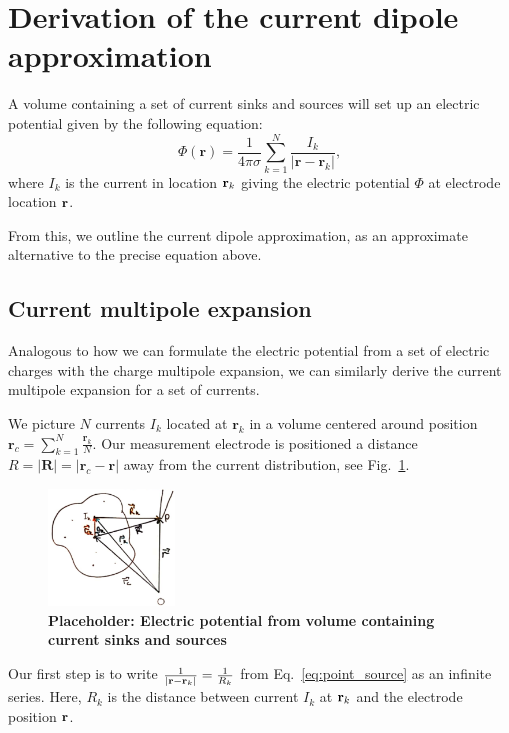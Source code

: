 \section{Derivation of the current dipole approximation}
\label{app:dipoleappendix}
A volume containing a set of current sinks and sources will set up an electric potential given by the following equation:
\begin{equation}\label{eq:point_source}
\Phi(\mathbf{r}) = \frac{1}{4 \pi \sigma} \sum_{k=1}^N \frac{I_k}{|\mathbf{r} - \mathbf{r}_k|},
\end{equation}
where $I_k$ is the current in location ${\bf r}_k$ giving the electric potential $\Phi$ at electrode location ${\bf r}$.

From this, we outline the current dipole approximation, as an approximate alternative to the precise equation above.

\subsection{Current multipole expansion}
Analogous to how we can formulate the electric potential from a set of electric charges with the charge multipole expansion, we can similarly derive the current multipole expansion for a set of currents.

We picture $N$ currents $I_k$ located at $\mathbf{r}_k$ in a volume centered around position $\mathbf{r}_c = \sum_{k = 1}^N \frac{\mathbf{r}_k}{N}$. Our measurement electrode is positioned a distance $R = |\mathbf{R}| = |\mathbf{r}_c - \mathbf{r}|$ away from the current distribution, see Fig.~\ref{fig:current_volume}.

\begin{figure}[!ht]
	\begin{center}
		\includegraphics[width=0.3\textwidth]{Figures/placeholder_appB1.png}
	\end{center}
	\caption{\textbf{Placeholder: Electric potential from volume containing current sinks and sources}}
	\label{fig:current_volume}
\end{figure}

Our first step is to write $\frac{1}{|{\bf r} - {\bf r}_k|} = \frac{1}{R_k}$ from Eq.~\ref{eq:point_source} as an infinite series. Here, $R_k$ is the distance between current $I_k$ at ${\bf r}_k$ and the electrode position ${\bf r}$.

